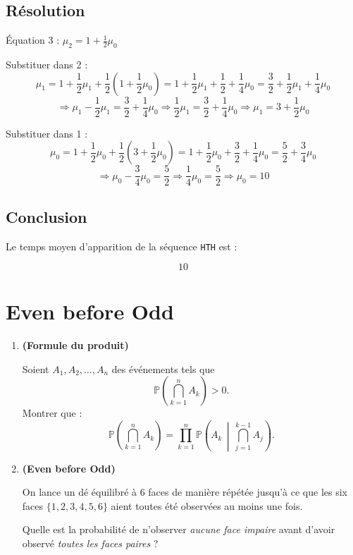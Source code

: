 \subsection*{Résolution}

Équation 3 : \( \mu_2 = 1 + \frac{1}{2} \mu_0 \)

Substituer dans 2 :
\[
\mu_1 = 1 + \frac{1}{2} \mu_1 + \frac{1}{2}(1 + \frac{1}{2} \mu_0)
= 1 + \frac{1}{2} \mu_1 + \frac{1}{2} + \frac{1}{4} \mu_0
= \frac{3}{2} + \frac{1}{2} \mu_1 + \frac{1}{4} \mu_0
\]
\[
\Rightarrow \mu_1 - \frac{1}{2} \mu_1 = \frac{3}{2} + \frac{1}{4} \mu_0
\Rightarrow \frac{1}{2} \mu_1 = \frac{3}{2} + \frac{1}{4} \mu_0
\Rightarrow \mu_1 = 3 + \frac{1}{2} \mu_0
\]

Substituer dans 1 :
\[
\mu_0 = 1 + \frac{1}{2} \mu_0 + \frac{1}{2}(3 + \frac{1}{2} \mu_0)
= 1 + \frac{1}{2} \mu_0 + \frac{3}{2} + \frac{1}{4} \mu_0
= \frac{5}{2} + \frac{3}{4} \mu_0
\]
\[
\Rightarrow \mu_0 - \frac{3}{4} \mu_0 = \frac{5}{2}
\Rightarrow \frac{1}{4} \mu_0 = \frac{5}{2}
\Rightarrow \mu_0 = 10
\]

\subsection*{Conclusion}

Le temps moyen d’apparition de la séquence \texttt{HTH} est :

\[
\boxed{10}
\]

\section{Even before Odd}

\begin{exerciseBox}

\begin{enumerate}
\item \textbf{(Formule du produit)}
  
Soient $A_1, A_2, \dots, A_n$ des événements tels que
\[
\mathbb{P}\left(\bigcap_{k=1}^n A_k\right) > 0.
\]
Montrer que :
\[
\mathbb{P}\left(\bigcap_{k=1}^n A_k\right)
=
\prod_{k=1}^n \mathbb{P}\left(A_k \,\middle|\, \bigcap_{j=1}^{k-1} A_j\right).
\]

\item \textbf{(Even before Odd)}
  
On lance un dé équilibré à 6 faces de manière répétée jusqu’à ce que les six faces $\{1,2,3,4,5,6\}$ aient toutes été observées au moins une fois.

Quelle est la probabilité de n’observer \emph{aucune face impaire} avant d’avoir observé \emph{toutes les faces paires} ?

\end{enumerate}

\end{exerciseBox}


